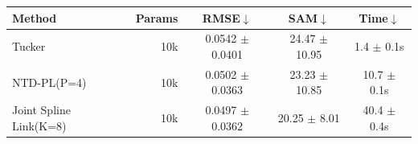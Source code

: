 \begin{tabular}{@{}l r c c c@{}}
\toprule
Method & Params & RMSE$\downarrow$ & SAM$\downarrow$ & Time$\downarrow$ \\
\midrule
Tucker & 10k & 0.0542 $\pm$ 0.0401 & 24.47 $\pm$ 10.95 & 1.4 $\pm$ 0.1s\\
NTD-PL(P=4) & 10k & 0.0502 $\pm$ 0.0363 & 23.23 $\pm$ 10.85 & 10.7 $\pm$ 0.1s\\
Joint Spline Link(K=8) & 10k & 0.0497 $\pm$ 0.0362 & 20.25 $\pm$ 8.01 & 40.4 $\pm$ 0.4s\\
\bottomrule
\end{tabular}
